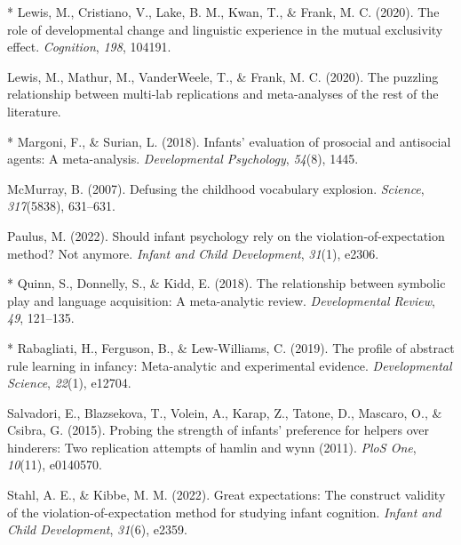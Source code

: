 \documentclass[10pt, letterpaper]{article}
\newenvironment{CSLReferences}%
  {}%
  {\par}
\begin{document}
\begin{CSLReferences}{1}{0}
\leavevmode{}%
* Lewis, M., Cristiano, V., Lake, B. M., Kwan, T., \& Frank, M. C.
(2020). The role of developmental change and linguistic experience in
the mutual exclusivity effect. \emph{Cognition}, \emph{198}, 104191.

\leavevmode{}%
Lewis, M., Mathur, M., VanderWeele, T., \& Frank, M. C. (2020). The
puzzling relationship between multi-lab replications and meta-analyses
of the rest of the literature.

\leavevmode{}%
* Margoni, F., \& Surian, L. (2018). Infants' evaluation of prosocial
and antisocial agents: A meta-analysis. \emph{Developmental Psychology},
\emph{54}(8), 1445.

\leavevmode{}%
McMurray, B. (2007). Defusing the childhood vocabulary explosion.
\emph{Science}, \emph{317}(5838), 631--631.

\leavevmode{}%
Paulus, M. (2022). Should infant psychology rely on the
violation-of-expectation method? Not anymore. \emph{Infant and Child
Development}, \emph{31}(1), e2306.

\leavevmode{}%
* Quinn, S., Donnelly, S., \& Kidd, E. (2018). The relationship between
symbolic play and language acquisition: A meta-analytic review.
\emph{Developmental Review}, \emph{49}, 121--135.

\leavevmode{}%
* Rabagliati, H., Ferguson, B., \& Lew-Williams, C. (2019). The profile
of abstract rule learning in infancy: Meta-analytic and experimental
evidence. \emph{Developmental Science}, \emph{22}(1), e12704.

\leavevmode{}%
Salvadori, E., Blazsekova, T., Volein, A., Karap, Z., Tatone, D.,
Mascaro, O., \& Csibra, G. (2015). Probing the strength of infants'
preference for helpers over hinderers: Two replication attempts of
hamlin and wynn (2011). \emph{PloS One}, \emph{10}(11), e0140570.

\leavevmode{}%
Stahl, A. E., \& Kibbe, M. M. (2022). Great expectations: The construct
validity of the violation-of-expectation method for studying infant
cognition. \emph{Infant and Child Development}, \emph{31}(6), e2359.


\end{CSLReferences}
\end{document}
